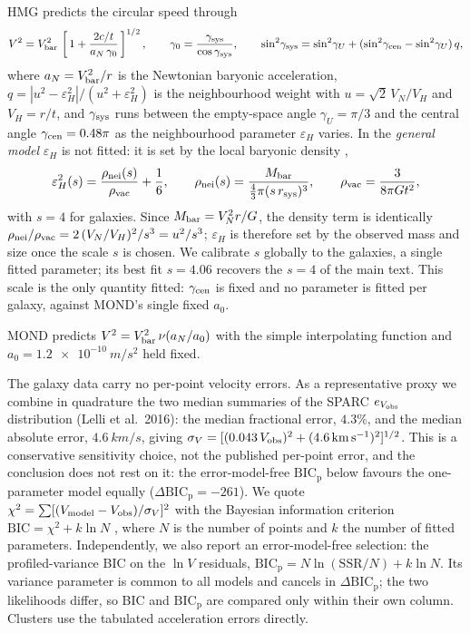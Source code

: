 \documentclass[11pt]{article}
\begin{document}
HMG predicts the circular speed through
\begin{equation}
  V^2=V_{\rm bar}^2\,\left[\,1+\frac{2c/t}{a_N\,\gamma_0}\,\right]^{1/2},
  \qquad
  \gamma_0=\frac{\gamma_{\rm sys}}{\cos\gamma_{\rm sys}},
  \qquad
  \sin^2\!\gamma_{\rm sys}=\sin^2\!\gamma_U+(\sin^2\!\gamma_{\rm cen}-\sin^2\!\gamma_U)\,q,
  \label{eq:hmg}
\end{equation}
where $a_N=V_{\rm bar}^2/r$ is the Newtonian baryonic acceleration,
$q=|u^2-\varepsilon_H^2|/(u^2+\varepsilon_H^2)$ is the neighbourhood weight with
$u=\sqrt2\,V_N/V_H$ and $V_H=r/t$, and $\gamma_{\rm sys}$ runs between the
empty-space angle $\gamma_U=\pi/3$ and the central angle $\gamma_{\rm cen}=0.48\pi$
as the neighbourhood parameter $\varepsilon_H$ varies.
In the \emph{general model} $\varepsilon_H$ is not fitted: it is set by the local
baryonic density \cite{Monjo2026},
\begin{equation}
  \varepsilon_H^2(s)=\frac{\rho_{\rm nei}(s)}{\rho_{\rm vac}}+\frac16,
  \qquad
  \rho_{\rm nei}(s)=\frac{M_{\rm bar}}{\tfrac43\pi(s\,r_{\rm sys})^3},
  \qquad
  \rho_{\rm vac}=\frac{3}{8\pi G t^2},
  \label{eq:density}
\end{equation}
with $s=4$ for galaxies. Since $M_{\rm bar}=V_N^2 r/G$, the density term is
identically $\rho_{\rm nei}/\rho_{\rm vac}=2\,(V_N/V_H)^2/s^3=u^2/s^3$;
$\varepsilon_H$ is therefore set by the observed mass and size once the scale $s$
is chosen. We calibrate $s$ globally to the galaxies, a single fitted parameter;
its best fit $s=4.06$ recovers the $s=4$ of the main text. This scale is the only
quantity fitted: $\gamma_{\rm cen}$ is fixed and no parameter is fitted per galaxy,
against MOND's single fixed $a_0$.

MOND \cite{Milgrom1983} predicts $V^2=V_{\rm bar}^2\,\nu(a_N/a_0)$ with the simple
interpolating function and $a_0=\SI{1.2e-10}{m/s^2}$ held fixed.

The galaxy data carry no per-point velocity errors. As a representative proxy we
combine in quadrature the two median summaries of the SPARC $e_{V_{\rm obs}}$
distribution (Lelli et al.\ 2016): the median fractional error, $4.3\%$, and the
median absolute error, $\SI{4.6}{km/s}$, giving
$\sigma_V=[(0.043\,V_{\rm obs})^2+(4.6\,{\rm km\,s^{-1}})^2]^{1/2}$. This is a
conservative sensitivity choice, not the published per-point error, and the
conclusion does not rest on it: the error-model-free $\mathrm{BIC_p}$ below favours
the one-parameter model equally ($\Delta\mathrm{BIC_p}=-261$). We quote
$\chi^2=\sum[(V_{\rm model}-V_{\rm obs})/\sigma_V]^2$ with the Bayesian information
criterion $\mathrm{BIC}=\chi^2+k\ln N$ \cite{Schwarz1978}, where $N$ is the number
of points and $k$ the number of fitted parameters. Independently, we also report
an error-model-free selection: the profiled-variance BIC on the $\ln V$ residuals,
$\mathrm{BIC_p}=N\ln(\mathrm{SSR}/N)+k\ln N$. Its variance parameter is common to
all models and cancels in $\Delta\mathrm{BIC_p}$; the two likelihoods differ, so
BIC and $\mathrm{BIC_p}$ are compared only within their own column. Clusters use
the tabulated acceleration errors directly.
\end{document}
